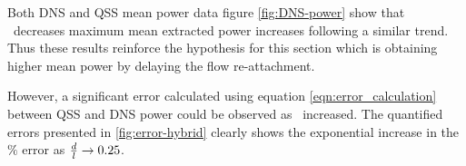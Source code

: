 Both  DNS and QSS mean power data figure \ref{fig:DNS-power} show that \ratio\ decreases maximum mean extracted power increases following a similar trend. Thus these results reinforce the hypothesis for this section which is obtaining higher mean power by delaying the flow re-attachment. 

However, a significant error calculated using equation \ref{eqn:error_calculation} between QSS and DNS power could be observed as \ratio\ increased. The quantified errors presented in \ref{fig:error-hybrid} clearly shows the exponential increase in the $\%$ error as $\frac{d}{l} \rightarrow 0.25$. 








